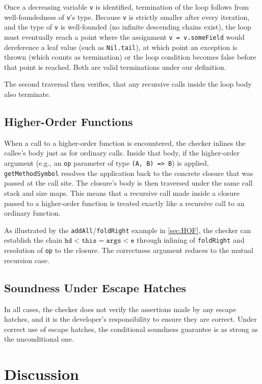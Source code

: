 Once a decreasing variable \texttt{v} is identified, termination of the loop
follows from well-foundedness of \texttt{v}'s type. Because \texttt{v} is
strictly smaller after every iteration, and the type of \texttt{v} is
well-founded (no infinite descending chains exist), the loop must eventually
reach a point where the assignment \texttt{v = v.someField} would dereference a
leaf value (such as \texttt{Nil.tail}), at which point an exception is thrown
(which counts as termination) or the loop condition becomes false before that
point is reached. Both are valid terminations under our definition.

The second traversal then verifies, that any recursive calls inside the loop
body also terminate.


\section{Higher-Order Functions}
When a call to a higher-order function is encountered, the checker inlines the
callee's body just as for ordinary calls. Inside that body, if the higher-order
argument (e.g., an \texttt{op} parameter of type \texttt{(A, B) => B}) is
applied, \texttt{getMethodSymbol} resolves the application back to the concrete
closure that was passed at the call site. The closure's body is then traversed
under the same call stack and size maps.
This means that a recursive call made inside a closure passed to a higher-order
function is treated exactly like a recursive call to an ordinary function.

As illustrated by the \texttt{addAll}/\texttt{foldRight} example in
\autoref{sec:HOF}, the checker can establish the chain
$\texttt{hd} < \texttt{this} = \texttt{args} < \texttt{e}$ through inlining
of \texttt{foldRight} and resolution of \texttt{op} to the closure. The
correctness argument reduces to the mutual recursion case.


\section{Soundness Under Escape Hatches}
In all cases, the checker does not verify the assertions made by any escape
hatches, and it is the developer's responsibility to ensure they are correct.
Under correct use of escape hatches, the conditional soundness guarantee is as
strong as the unconditional one.


\chapter{Discussion}


